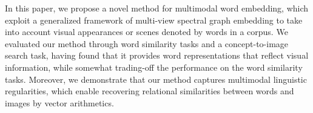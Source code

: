 In this paper, we propose a novel method for multimodal word embedding, which exploit a generalized framework of multi-view spectral graph embedding to take into account visual appearances or scenes denoted by words in a corpus. We evaluated our method through word similarity tasks and a concept-to-image search task, having found that it provides word representations that reflect visual information, while somewhat trading-off the performance on the word similarity tasks. Moreover, we demonstrate that our method captures multimodal linguistic regularities, which enable recovering relational similarities between words and images by vector arithmetics.
